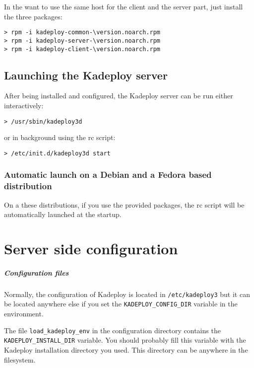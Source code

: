 \documentclass[a4wide,10pt,oneside]{book}
\newcommand{\version}{3.1.7}
\begin{document}
\noindent In the want to use the same host for the client and the server part, just install the three packages:
\begin{small}
\begin{Verbatim}[commandchars=\\\{\}]
> rpm -i kadeploy-common-\version.noarch.rpm
> rpm -i kadeploy-server-\version.noarch.rpm
> rpm -i kadeploy-client-\version.noarch.rpm
\end{Verbatim}
\end{small}


\section{Launching the Kadeploy server}
After being installed and configured, the Kadeploy server can be run either interactively:
\begin{small}
\begin{verbatim}
> /usr/sbin/kadeploy3d
\end{verbatim}
\end{small}
\noindent or in background using the rc script:
\begin{small}
\begin{verbatim}
> /etc/init.d/kadeploy3d start
\end{verbatim}
\end{small}

\subsection{Automatic launch on a Debian and a Fedora based distribution}
\noindent On a these distributions, if you use the provided packages, the rc script will be automatically launched at the startup.

\chapter{Server side configuration}\label{chap:Server_side_conf}
\paragraph{Configuration files\\}\label{sec:confpath}
Normally, the configuration of Kadeploy is located in \texttt{/etc/kadeploy3} but it can be located anywhere else if you set the \texttt{KADEPLOY\_CONFIG\_DIR} variable in the environment.

The file \texttt{load\_kadeploy\_env} in the configuration directory contains the \texttt{KADEPLOY\_INSTALL\_DIR} variable. You should probably fill this variable with the Kadeploy installation directory you used. This directory can be anywhere in the filesystem.
\end{document}

